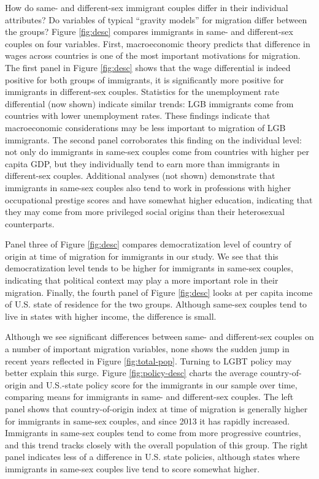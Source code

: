 \documentclass[
  11pt,
]{article}
\begin{document}
How do same- and different-sex immigrant couples differ in their individual attributes? Do variables of typical ``gravity models'' for migration differ between the groups? Figure \ref{fig:desc} compares immigrants in same- and different-sex couples on four variables. First, macroeconomic theory predicts that difference in wages across countries is one of the most important motivations for migration. The first panel in Figure \ref{fig:desc} shows that the wage differential is indeed positive for both groups of immigrants, it is significantly more positive for immigrants in different-sex couples. Statistics for the unemployment rate differential (now shown) indicate similar trends: LGB immigrants come from countries with lower unemployment rates. These findings indicate that macroeconomic considerations may be less important to migration of LGB immigrants. The second panel corroborates this finding on the individual level: not only do immigrants in same-sex couples come from countries with higher per capita GDP, but they individually tend to earn more than immigrants in different-sex couples. Additional analyses (not shown) demonstrate that immigrants in same-sex couples also tend to work in professions with higher occupational prestige scores and have somewhat higher education, indicating that they may come from more privileged social origins than their heterosexual counterparts.

Panel three of Figure \ref{fig:desc} compares democratization level of country of origin at time of migration for immigrants in our study. We see that this democratization level tends to be higher for immigrants in same-sex couples, indicating that political context may play a more important role in their migration. Finally, the fourth panel of Figure \ref{fig:desc} looks at per capita income of U.S. state of residence for the two groups. Although same-sex couples tend to live in states with higher income, the difference is small.

Although we see significant differences between same- and different-sex couples on a number of important migration variables, none shows the sudden jump in recent years reflected in Figure \ref{fig:total-pop}. Turning to LGBT policy may better explain this surge. Figure \ref{fig:policy-desc} charts the average country-of-origin and U.S.-state policy score for the immigrants in our sample over time, comparing means for immigrants in same- and different-sex couples. The left panel shows that country-of-origin index at time of migration is generally higher for immigrants in same-sex couples, and since 2013 it has rapidly increased. Immigrants in same-sex couples tend to come from more progressive countries, and this trend tracks closely with the overall population of this group. The right panel indicates less of a difference in U.S. state policies, although states where immigrants in same-sex couples live tend to score somewhat higher.
\end{document}
